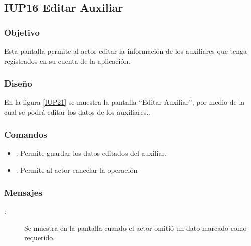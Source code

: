 \subsection{IUP16 Editar Auxiliar}
 
\subsubsection{Objetivo}

    Esta pantalla permite al actor editar la información de los auxiliares que tenga registrados en su cuenta de la aplicación.

\subsubsection{Diseño}

    En la figura \ref{IUP21} se muestra la pantalla ``Editar Auxiliar'', por medio de la cual se podrá editar los datos de los auxiliares.. \\


\subsubsection{Comandos}
\begin{itemize}
    \item {}: Permite guardar los datos editados del auxiliar.
    \item {}: Permite al actor cancelar la operación
    
\end{itemize}

\subsubsection{Mensajes}

\begin{description}
    \item[:] Se muestra en la pantalla  cuando el actor omitió un dato marcado como requerido.
    
\end{description}
